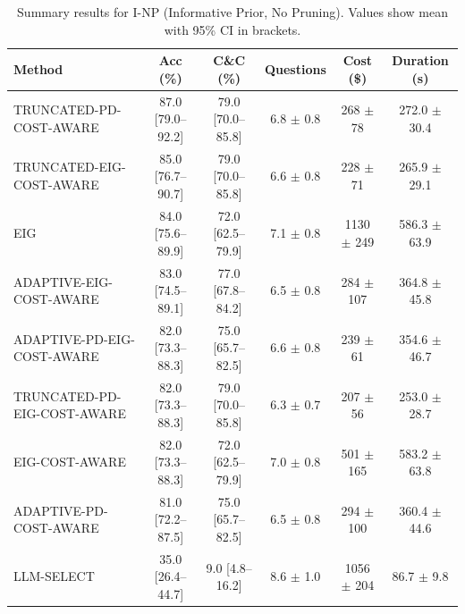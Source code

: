 \begin{table}[htbp]
\centering
\small
\caption{Summary results for I-NP (Informative Prior, No Pruning). Values show mean with 95\% CI in brackets.}
\label{tab:results-notprune_notuniform}
\begin{tabular}{@{}lccccc@{}}
\toprule
Method & Acc (\%) & C\&C (\%) & Questions & Cost (\$) & Duration (s) \\
\midrule
TRUNCATED-PD-COST-AWARE & 87.0 [79.0--92.2] & 79.0 [70.0--85.8] & 6.8 $\pm$ 0.8 & 268 $\pm$ 78 & 272.0 $\pm$ 30.4 \\
TRUNCATED-EIG-COST-AWARE & 85.0 [76.7--90.7] & 79.0 [70.0--85.8] & 6.6 $\pm$ 0.8 & 228 $\pm$ 71 & 265.9 $\pm$ 29.1 \\
EIG & 84.0 [75.6--89.9] & 72.0 [62.5--79.9] & 7.1 $\pm$ 0.8 & 1130 $\pm$ 249 & 586.3 $\pm$ 63.9 \\
ADAPTIVE-EIG-COST-AWARE & 83.0 [74.5--89.1] & 77.0 [67.8--84.2] & 6.5 $\pm$ 0.8 & 284 $\pm$ 107 & 364.8 $\pm$ 45.8 \\
ADAPTIVE-PD-EIG-COST-AWARE & 82.0 [73.3--88.3] & 75.0 [65.7--82.5] & 6.6 $\pm$ 0.8 & 239 $\pm$ 61 & 354.6 $\pm$ 46.7 \\
TRUNCATED-PD-EIG-COST-AWARE & 82.0 [73.3--88.3] & 79.0 [70.0--85.8] & 6.3 $\pm$ 0.7 & 207 $\pm$ 56 & 253.0 $\pm$ 28.7 \\
EIG-COST-AWARE & 82.0 [73.3--88.3] & 72.0 [62.5--79.9] & 7.0 $\pm$ 0.8 & 501 $\pm$ 165 & 583.2 $\pm$ 63.8 \\
ADAPTIVE-PD-COST-AWARE & 81.0 [72.2--87.5] & 75.0 [65.7--82.5] & 6.5 $\pm$ 0.8 & 294 $\pm$ 100 & 360.4 $\pm$ 44.6 \\
LLM-SELECT & 35.0 [26.4--44.7] & 9.0 [4.8--16.2] & 8.6 $\pm$ 1.0 & 1056 $\pm$ 204 & 86.7 $\pm$ 9.8 \\
\bottomrule
\end{tabular}
\end{table}